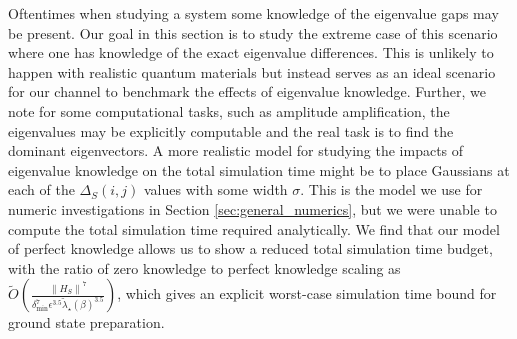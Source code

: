 \documentclass[
 amsmath,amssymb,
 aps,
onecolumn, 
nofootinbib]{revtex4-2}
\newcommand{\norm}[1]{\left\| #1 \right\|}
\newcommand{\bigotilde}[1]{\widetilde{O} \left( #1 \right)}
\begin{document}
Oftentimes when studying a system some knowledge of the eigenvalue gaps may be present. Our goal in this section is to study the extreme case of this scenario where one has knowledge of the exact eigenvalue differences. This is unlikely to happen with realistic quantum materials but instead serves as an ideal scenario for our channel to benchmark the effects of eigenvalue knowledge. Further, we note for some computational tasks, such as amplitude amplification, the eigenvalues may be explicitly computable and the real task is to find the dominant eigenvectors. A more realistic model for studying the impacts of eigenvalue knowledge on the total simulation time might be to place Gaussians at each of the $\Delta_S(i,j)$ values with some width $\sigma$. This is the model we use for numeric investigations in Section \ref{sec:general_numerics}, but we were unable to compute the total simulation time required analytically. We find that our model of perfect knowledge allows us to show a reduced total simulation time budget, with the ratio of zero knowledge to perfect knowledge scaling as $\bigotilde{\frac{\norm{H_S}^7}{\delta_{\min}^7 \epsilon^{3.5} \widetilde{\lambda}_\star(\beta)^{3.5}}}$, 
     which gives an explicit worst-case simulation time bound for ground state preparation.
\end{document}
